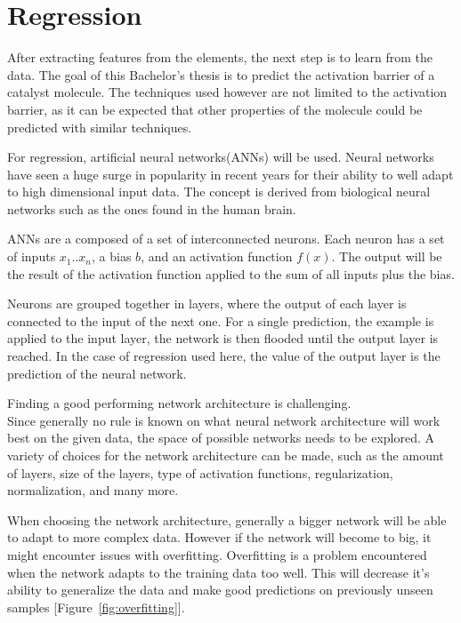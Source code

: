 
\chapter{Regression}
\label{ch:Regression}

After extracting features from the elements, the next step is to learn from the data.
The goal of this Bachelor's thesis is to predict the activation barrier of a catalyst molecule.
The techniques used however are not limited to the activation barrier, 
as it can be expected that other properties of the molecule could be predicted with similar techniques.

For regression, artificial neural networks(ANNs) will be used.
Neural networks have seen a huge surge in popularity in recent years for their ability to well
adapt to high dimensional input data.
The concept is derived from biological neural networks such as the ones found in the human brain.

ANNs are a composed of a set of interconnected neurons.
Each neuron has a set of inputs $x_1 .. x_n$, a bias $b$, and an activation function $f(x)$.
The output will be the result of the activation function applied to the sum of all inputs plus the bias.

Neurons are grouped together in layers, where the output of each layer is connected to the input of the next one.
For a single prediction, the example is applied to the input layer, the network is then flooded until the output layer is reached.
In the case of regression used here, the value of the output layer is the prediction of the neural network.

Finding a good performing network architecture is challenging. \\
Since generally no rule is known on what neural network architecture will work best on the given data, the space of possible networks needs to be explored.
A variety of choices for the network architecture can be made, such as the amount of layers, size of the layers, type of activation functions, regularization, normalization, and many more.

When choosing the network architecture, generally a bigger network will be able to adapt to more complex data.
However if the network will become to big, it might encounter issues with overfitting.
Overfitting is a problem encountered when the network adapts to the training data too well.
This will decrease it's ability to generalize the data and make good predictions on previously unseen samples [Figure~\ref{fig:overfitting}].

